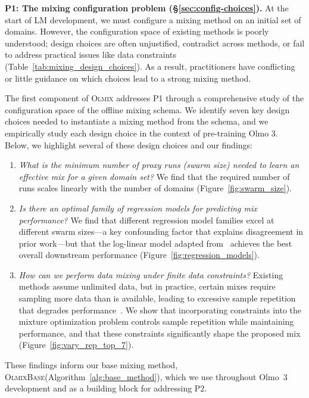 \documentclass[table]{ai2style/ai2}
\newcommand{\olmix}{\textsc{Olmix}\xspace}
\newcommand{\base}[0]{\textsc{OlmixBase}\xspace}
\begin{document}
\textbf{P1: The mixing configuration problem (\S\ref{sec:config-choices}).} At the start of LM development, we must configure a mixing method on an initial set of domains. However, the configuration space of existing methods is poorly understood; design choices are often unjustified, contradict across methods, or fail to address practical issues like data constraints (Table~\ref{tab:mixing_design_choices}). 
As a result, practitioners have conflicting or little guidance on which choices lead to a strong mixing method.

The first component of \olmix addresses P1 through a comprehensive study of the configuration space of the offline mixing schema. 
We identify seven key design choices needed to instantiate a mixing method from the schema, and we empirically study each design choice in the context of pre-training Olmo 3. Below, we highlight several of these design choices and our findings:
\begin{enumerate}[itemsep=0pt, topsep=2pt, leftmargin=12pt]
    \item \emph{What is the minimum number of proxy runs (swarm size) needed to learn an effective mix for a given domain set?} 
    We find that the required number of runs scales linearly with the number of domains (Figure~\ref{fig:swarm_size}).

    \item \emph{Is there an optimal family of regression models for predicting mix performance?}
    We find that different regression model families excel at different swarm sizes---a key confounding factor that explains disagreement in prior work---but that the log-linear model adapted from~\citet{ye2025datamixinglawsoptimizing} achieves the best overall downstream performance (Figure~\ref{fig:regression_models}).   
        
    \item \emph{How can we perform data mixing under finite data constraints?} Existing methods assume unlimited data, but in practice, certain mixes require sampling more data than is available, leading to excessive sample repetition that degrades performance~\citep{muennighoff2025scalingdataconstrainedlanguagemodels}. We show that incorporating constraints into the mixture optimization problem controls sample repetition while maintaining performance, and that these constraints significantly shape the proposed mix (Figure~\ref{fig:vary_rep_top_7}).    
\end{enumerate}

These findings inform our base mixing method, \base (Algorithm~\ref{alg:base_method}), which we use throughout Olmo~3 development and as a building block for addressing P2.
\end{document}
